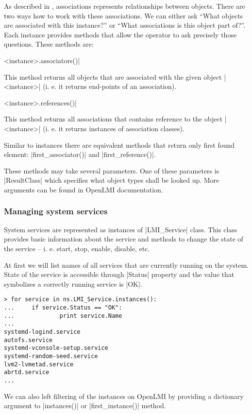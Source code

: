 As described in , associations represents relationships
between objects. There are two ways how to work with these associations. We
can either ask ``What objects are associated with this instance?'' or ``What
associations is this object part of?''. Each instance provides methods that
allow the operator to ask precisely those questions. These methods are:

\begin{funcproto}
<instance>.associators()| 
\end{funcproto}
\begin{funcdesc}
This method returns all objects that are associated with the given object
|<instance>| (i. e. it returns end-points of an association).
\end{funcdesc}

\begin{funcproto}
<instance>.references()| 
\end{funcproto}
\begin{funcdesc}
This method returns all associations that contains reference to the object
|<instance>| (i. e. it returns instances of association classes).
\end{funcdesc}
\funclistend
Similar to instances there are equivalent methods that return only first found
element: |first_associator()| and |first_reference()|.


These methods may take several parameters. One of these parameters is
|ResultClass| which specifies what object types shall be looked up. More
arguments can be found in OpenLMI documentation.

\subsubsection{Managing system services}
\label{openlmi:shell:examples:services}

System services are represented as instances of |LMI_Service| class. This class
provides basic information about the service and methods to change the state of
the service -- i. e. start, stop, enable, disable, etc.

At first we will list names of all services that are currently running on the
system. State of the service is accessible through |Status| property and the
value that symbolizes a correctly running service is |OK|.

\begin{lstlisting}[]
> for service in ns.LMI_Service.instances():
...     if service.Status == "OK":
...             print service.Name
... 
systemd-logind.service
autofs.service
systemd-vconsole-setup.service
systemd-random-seed.service
lvm2-lvmetad.service
abrtd.service
...
\end{lstlisting}
\funclistend
We can also left filtering of the instances on OpenLMI by providing a dictionary
argument to |instances()| or |first_instance()| method. 

